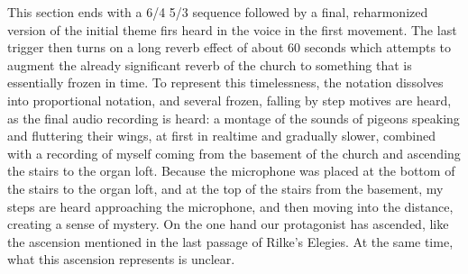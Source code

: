 \documentclass[12pt,twoside,maitrise]{dms_ks}
\theoremstyle{definition}
\begin{document}


This section ends with a 6/4 5/3 sequence followed by a final, reharmonized version of the initial theme firs heard in the voice in the first movement. 
The last trigger then turns on a long reverb effect of about 60 seconds which attempts to augment the already significant reverb of the church to something that is essentially frozen in time. 
To represent this timelessness, the notation dissolves into proportional notation, and several frozen, falling by step motives are heard, as the final audio recording is heard: a montage of the sounds of pigeons speaking and fluttering their wings, at first in realtime and gradually slower, combined with a recording of myself coming from the basement of the church and ascending the stairs to the organ loft. 
Because the microphone was placed at the bottom of the stairs to the organ loft, and at the top of the stairs from the basement, my steps are heard approaching the microphone, and then moving into the distance, creating a sense of mystery. 
On the one hand our protagonist has ascended, like the ascension mentioned in the last passage of Rilke's Elegies. 
At the same time, what this ascension represents is unclear.





\end{document}
